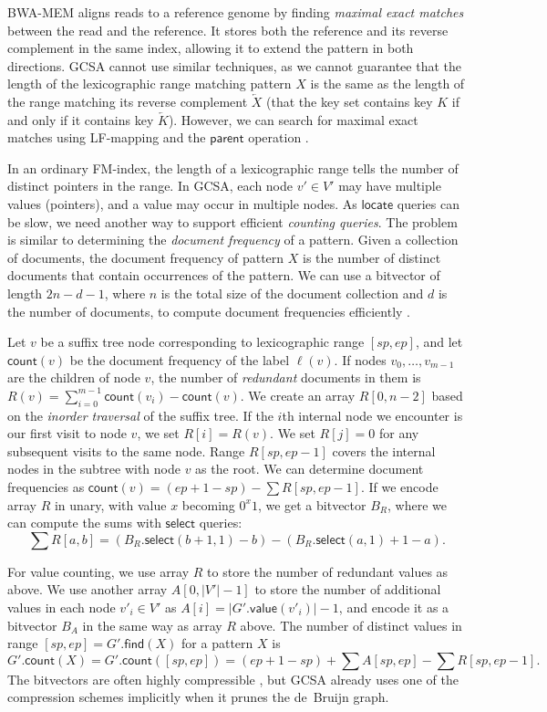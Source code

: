 \documentclass[a4paper,11pt]{llncs}
\newcommand{\abs}[1]{\ensuremath{\lvert #1 \rvert}}
\newcommand{\revcomp}[1]{\ensuremath{\overleftarrow{#1}}}
\newcommand{\select}{\ensuremath{\mathsf{select}}}
\newcommand{\find}{\ensuremath{\mathsf{find}}}
\newcommand{\locate}{\ensuremath{\mathsf{locate}}}
\newcommand{\parent}{\ensuremath{\mathsf{parent}}}
\newcommand{\countq}{\ensuremath{\mathsf{count}}}
\newcommand{\gvalue}{\ensuremath{\mathsf{value}}}
\newcommand{\LFmapping}{LF\nobreakdash-mapping}
\begin{document}
BWA-MEM \cite{Li2013} aligns reads to a reference genome by finding \emph{maximal exact matches} between the read and the reference. It stores both the reference and its reverse complement in the same index, allowing it to extend the pattern in both directions. GCSA cannot use similar techniques, as we cannot guarantee that the length of the lexicographic range matching pattern $X$ is the same as the length of the range matching its reverse complement $\revcomp{X}$ (that the key set contains key $K$ if and only if it contains key $\revcomp{K}$). However, we can search for maximal exact matches using \LFmapping{} and the $\parent$ operation \cite{Ohlebusch2010a}.

In an ordinary FM\nobreakdash-index, the length of a lexicographic range tells the number of distinct pointers in the range. In GCSA, each node $v' \in V'$ may have multiple values (pointers), and a value may occur in multiple nodes. As $\locate$ queries can be slow, we need another way to support efficient \emph{counting queries}. The problem is similar to determining the \emph{document frequency} of a pattern. Given a collection of documents, the document frequency of pattern $X$ is the number of distinct documents that contain occurrences of the pattern. We can use a bitvector of length $2n-d-1$, where $n$ is the total size of the document collection and $d$ is the number of documents, to compute document frequencies efficiently \cite{Sadakane2007a}.

Let $v$ be a suffix tree node corresponding to lexicographic range $[sp, ep]$, and let $\countq(v)$ be the document frequency of the label $\ell(v)$. If nodes $v_{0}, \dotsc, v_{m-1}$ are the children of node $v$, the number of \emph{redundant} documents in them is $R(v) = \sum_{i=0}^{m-1} \countq(v_{i}) - \countq(v)$. We create an array $R[0, n-2]$ based on the \emph{inorder traversal} of the suffix tree. If the $i$th internal node we encounter is our first visit to node $v$, we set $R[i] = R(v)$. We set $R[j] = 0$ for any subsequent visits to the same node. Range $R[sp, ep-1]$ covers the internal nodes in the subtree with node $v$ as the root. We can determine document frequencies as $\countq(v) = (ep+1-sp) - \sum R[sp, ep-1]$. If we encode array $R$ in unary, with value $x$ becoming $0^{x} 1$, we get a bitvector $B_{R}$, where we can compute the sums with $\select$ queries:
$$
\sum R[a, b] = (B_{R}.\select(b+1, 1) - b) - (B_{R}.\select(a, 1) + 1 - a).
$$

For value counting, we use array $R$ to store the number of redundant values as above. We use another array $A[0, \abs{V'}-1]$ to store the number of additional values in each node $v'_{i} \in V'$ as $A[i] = \abs{G'.\gvalue(v'_{i})}-1$, and encode it as a bitvector $B_{A}$ in the same way as array $R$ above. The number of distinct values in range $[sp,ep] = G'.\find(X)$ for a pattern $X$ is
$$
G'.\countq(X) = G'.\countq([sp, ep]) = (ep+1-sp) + \sum A[sp, ep] - \sum R[sp, ep-1].
$$
The bitvectors are often highly compressible \cite{Gagie2015}, but GCSA already uses one of the compression schemes implicitly when it prunes the de~Bruijn graph.
\end{document}
